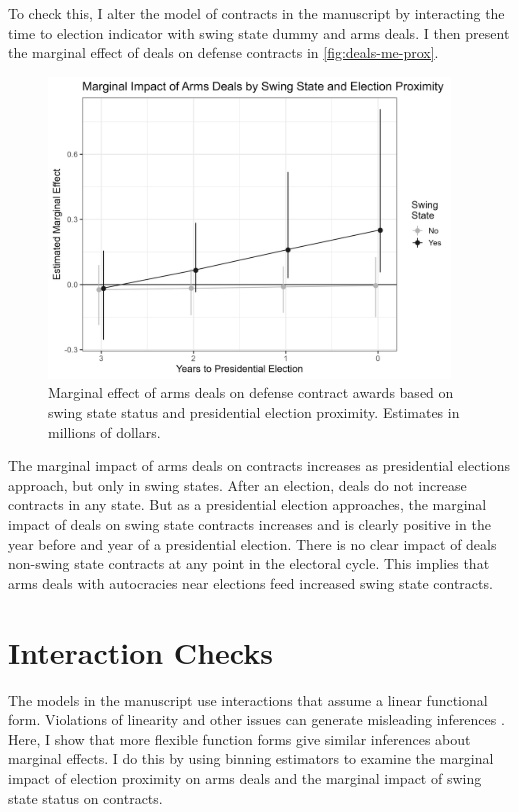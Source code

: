\documentclass[12pt]{article}
\begin{document}
To check this, I alter the model of contracts in the manuscript by interacting the time to election indicator with swing state dummy and arms deals. 
I then present the marginal effect of deals on defense contracts in \autoref{fig:deals-me-prox}. 


\begin{figure}[htpb]
	\centering
		\includegraphics[width=0.95\textwidth]{deals-me-prox.png}
	\caption{Marginal effect of arms deals on defense contract awards based on swing state status and presidential election proximity. Estimates in millions of dollars.}
	\label{fig:deals-me-prox}
\end{figure}


The marginal impact of arms deals on contracts increases as presidential elections approach, but only in swing states. 
After an election, deals do not increase contracts in any state. 
But as a presidential election approaches, the marginal impact of deals on swing state contracts increases and is clearly positive in the year before and year of a presidential election. 
There is no clear impact of deals non-swing state contracts at any point in the electoral cycle. 
This implies that arms deals with autocracies near elections feed increased swing state contracts. 

\newpage 

\section{Interaction Checks}

The models in the manuscript use interactions that assume a linear functional form. 
Violations of linearity and other issues can generate misleading inferences \citep{Hainmuelleretal2019}. 
Here, I show that more flexible function forms give similar inferences about marginal effects. 
I do this by using binning estimators to examine the marginal impact of election proximity on arms deals and the marginal impact of swing state status on contracts.
\end{document}
